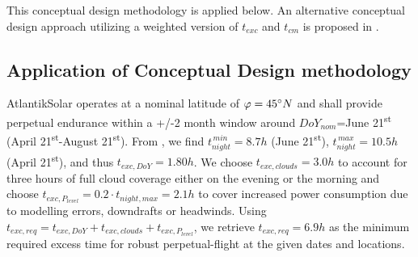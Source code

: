 This conceptual design methodology is applied below. An alternative conceptual design approach utilizing a weighted version of $t_{exc}$ and $t_{cm}$ is proposed in \cite{Morton_ICRA2013}. 

 
\subsection{Application of Conceptual Design methodology} \label{sec:ConceptDesignApplication}

AtlantikSolar operates at a nominal latitude of $\varphi=45\degree N$ and shall provide perpetual endurance within a +/-2 month window around $DoY_{nom}$=June 21\textsuperscript{st} (April 21\textsuperscript{st}-August 21\textsuperscript{st}). From \cite{Duffie_SolarEngineering}, we find $t_{night}^{\,min}=8.7h$ (June 21\textsuperscript{st}), $t_{night}^{\,max}=10.5h$(April 21\textsuperscript{st}), and thus $t_{exc,DoY}=1.80h$. We choose $t_{exc,clouds}=3.0h$ to account for three hours of full cloud coverage either on the evening or the morning and choose $t_{exc,P_{level}}=0.2\cdot t_{night,max}=2.1h$ to cover increased power consumption due to modelling errors, downdrafts or headwinds. Using $t_{exc,req}=t_{exc,DoY}+t_{exc,clouds}+t_{exc,P_{level}}$, we retrieve $t_{exc,req}=6.9h$ as the minimum required excess time for robust perpetual-flight at the given dates and locations. 

